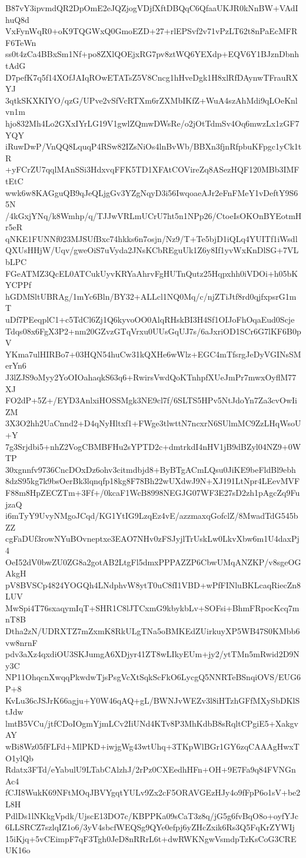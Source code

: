 B87vY3ipvmdQR2DpOmE2eJQZjogVDjfXftDBQqC6QfaaUKJR0kNnBW+VAdIhuQ8d
VxFynWqR0+oK9TQGWxQ0GmoEZD+27+rlEPSvf2v71vPzLT62t8nPaEcMFRF6TeWn
ss0t4zCa4BBxSm1Nf+po8ZXlQOEjxRG7pv8ztWQ6YEXdp+EQV6Y1BJznDbnhtAdG
D7pefK7q5f14XOfJAIqROwETATsZ5V8Cncg1hHveDgk1H8xlRfDAynwTFrauRXYJ
3qtkSKXKIYO/qzG/UPve2vSfVcRTXm6rZXMbIKfZ+WuA4szAhMdi9qLOeKnlvn1m
hjo832Mh4Lo2GXxIYrLG19V1gwlZQmwDWsRe/o2jOtTdmSv4Oq6mwzLx1zGF7YQY
iRuwDwP/VnQQ8LquqP4RSw82IZsNiOs4lnBvWb/BBXn3fjnRfpbuKFpgc1yCk1tR
+yFCrZU7qqlMAnSSi3HdxvqFFK5TD1XFAtCOVireZq8ASezHQF120MBb3IMFtEtC
wwk6w8KAGguQB9qJeQLjgGv3YZgNqyD3i56IwqoaeAJr2eFnFMeY1vDeftY9S65N
/4kGxjYNq/k8Wmhp/q/TJJwVRLmUCrU7ht5n1NPp26/CtoeIsOKOnBYEotmHr5eR
qNKE1FUNNf023MJSUfBxc74hkks6n7osjn/Nz9/T+Te5bjD1iQLq4YUITf1iWsdl
QXUsHHjW/Uqv/gweOiS7uVyda2JNsKCbREguUk1Z6y8If1yvWxKnDlSG+7VLbLPC
FGeATMZ3QcEL0ATCukUyvKRYaAhrvFgHUTnQutz25Hqpxhh0iVDOi+h05bKYCPPf
hGDMSltUBRAg/1mYc6Bln/BY32+ALLcl1NQ0Mq/c/njZTiJtf8rd0qjfxpsrG1mT
uDf7PEeqplC1+c5TdCl6Zj1Q6kyvoOO0AlqRHskBI3H4Sf1OIJoFhOqaEud0Scje
Tdqs08x6FgX3P2+nm20GZvzGTqVrxu0UUsGqUJ7s/6aJxriOD1SCr6G7lKF6B0pV
YKma7ulHIRBo7+03HQN54huCw31kQXHe6wWlz+EGC4mTfsrgJeDyVGINsSMerYn6
J3lZJS9oMyy2YoOIOahaqkS63q6+RwirsVwdQoKTnhpfXUeJmPr7mwxOyflM77XJ
FO2dP+5Z+/EYD3AnlxiHOSSMgk3NE9cl7f/6SLTS5HPv5NtJdoYn7Za3cvOwIiZM
3X3O2hh2UaCnnd2+D4qNyHltxf1+FWge3tlwttN7ncxrN6SUlmMC9ZzLHqWsoU+Y
7g3Srjdbi5+nhZ2VogCBMBFHu2sYPTD2c+dmtrkdI4nHV1jB9dBZyl04NZ9+0WTP
30xgnnfv9736CncDOxDz6ohv3citmdbjd8+ByBTgACmLQsu0JiKE9beFldBl9ebh
8dzS95kg7k9bsOerBk3lqnqfp18kg8F78Bh22wUXdwJ9N+XJ191LtNpr4LEevMVF
F88m8HpZECZTm+3Ff+/0kcaF1WcB8998NEGJG07WF3E27sD2zh1pAgcZq9FujzaQ
i6mTyY9UvyNMgoJCqd/KG1YtIG9LzqEz4vE/azzmaxqGofclZ/8MwadTdG545bZZ
cgFaDUf3rowNYuBOvneptxe3EAO7NHv0zFSJyjlTrUskLw0LkvXbw6m1U4daxPj4
OeI52dV0bwZU0ZG8a2gotAB2LtgFl5dmxPPPAZZP6CbwUMqANZKP/v8sgeOGAkgH
pV8BVSCp4824YOGQh4LNdphvW8ytT0uC8fI1VBD+wPfFINluBKLcaqRiecZn8LUV
MwSpi4T76sxaqymIqT+SHR1C8lJTCxmG9kbykbLv+SOFsi+BhmFRpocKcq7mnT8B
Dtha2zN/UDRXTZ7mZxmK8RkULgTNa5oBMKEdZUirkuyXP5WB47S0KMbb6vw8nrnF
pdv3aXz4qxdiOU3SKJumgA6XDjyr41ZT8wLIkyEUm+jy2/ytTMn5mRwid2D9Ny3C
NP11OhqcnXwqqPkwdwTjsPsgVcXtSqkScFkO6LycgQ5NNRTeBSnqiOVS/EUG6P+8
KvLu36cJSJrK66agju+Y0W46qAQ+gL/BWNJvWEZv3l8iHTzhGFfMXySbDKlStJdw
lmtB5VCu/jtfCDoIOgmYjmLCv2IiUNd4KTv8P3MhKdbB8sRqltCPgiE5+XakgvAY
wBi8Wz05fFLFd+MlPKD+iwjgWg43wtUhq+3TKpWlBGr1GY6zqCAAAgHwxTO1ylQb
Rdatx3FTd/eYabulU9LTabCAlzhJ/2rPz0CXEedhHFn+OH+9E7Fa9q84FVNGnAc4
fCJI8WukK69NFtMOqJBVYgqtYULv9Zx2cF5ORAVGEzHJy4o9fFpP6o1sV+be2L8H
PdlDs1lNKkgVpdk/UjscE13DO7c/KBPPKa09sCaT3z8q/jG5g6fvBqO8o+oyfYJc
6LLSRCZ7szlqIZ1o6/3yV4sbcfWEQSg9QYe0efpj6yZHcZxik6Rs3Q5FqKrZYWIj
15iKjq+5vCEimpF7qF3Tgh0JeD8nRRrL6t+dwRWKNgwVsmdpTzKsCoG3CREUK16o
